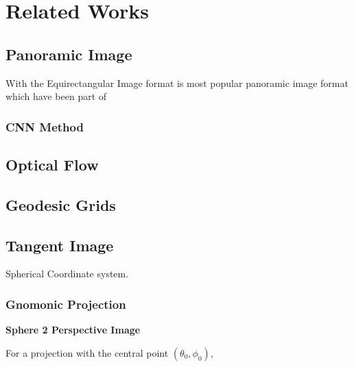 \section{Related Works}





\subsection{Panoramic Image }

With the
Equirectangular Image format is most popular panoramic image format which have been part of 



\subsubsection{CNN Method}





\subsection{Optical Flow}











\subsection{Geodesic Grids}



\subsection{Tangent Image}


Spherical Coordinate system.



\subsubsection{Gnomonic Projection}

\textbf{Sphere 2 Perspective Image}


For a projection with the central point $(\theta_0, \phi_0)$,



